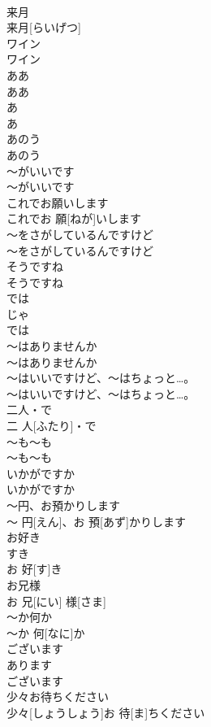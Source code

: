 \documentclass[8pt]{extreport}
\begin{document}
\begin{CJK}{UTF8}{min}
\\	来月	
\\	来月[らいげつ]		
\\	ワイン	
\\	ワイン		
\\	ああ	
\\	ああ		
\\	あ	
\\	あ		
\\	あのう	
\\	あのう		
\\	〜がいいです	
\\	〜がいいです		
\\	これでお願いします	
\\	これでお 願[ねが]いします		
\\	〜をさがしているんですけど	
\\	〜をさがしているんですけど		
\\	そうですね	
\\	そうですね		
\\	では	
\\	じゃ 
\\	では		
\\	〜はありませんか	
\\	〜はありませんか		
\\	〜はいいですけど、〜はちょっと…。	
\\	〜はいいですけど、〜はちょっと…。		
\\	二人・で	
\\	二 人[ふたり]・で		
\\	〜も〜も	
\\	〜も〜も		
\\	いかがですか	
\\	いかがですか		
\\	〜円、お預かりします	
\\	〜 円[えん]、お 預[あず]かりします		
\\	お好き	
\\	すき 
\\	お 好[す]き		
\\	お兄様	
\\	お 兄[にい] 様[さま]		
\\	〜か何か	
\\	〜か 何[なに]か		
\\	ございます	
\\	あります
\\	ございます		
\\	少々お待ちください	
\\	少々[しょうしょう]お 待[ま]ちください		

\end{CJK}
\end{document}
